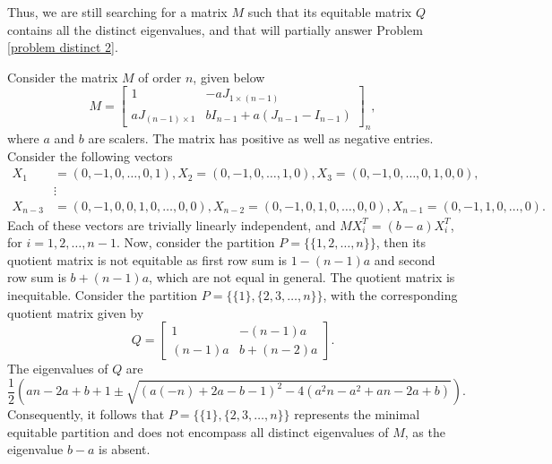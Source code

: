 \documentclass[12pt,twoside]{article}
\begin{document}
Thus, we are still searching  for a matrix $M$ such that its equitable matrix $Q$ contains all the distinct eigenvalues, and that will partially answer Problem \eqref{problem distinct 2}.

Consider the matrix $M$ of order $n$,  given below
\begin{equation}\label{mat 1}
	 M=\begin{bmatrix}
	1 & -aJ_{1\times (n-1)}\\
	a J_{(n-1)\times 1} & bI_{n-1}+a(J_{n-1}-I_{n-1})
\end{bmatrix}_{n},
\end{equation}
where $a$ and $b$ are scalers. The matrix has positive as well as negative entries. Consider the following vectors
\begin{align*}
	X_{1}&=(0,-1,0,\dots,0,1),X_{2}=(0,-1,0,\dots,1,0), X_{3}=(0,-1,0,\dots,0,1,0,0),\\
	&\vdots\\
	X_{n-3}&=(0,-1,0,0,1,0,\dots,0, 0), X_{n-2}=(0,-1,0,1,0,\dots,0,0),X_{n-1}=(0,-1,1,0,\dots,0).
\end{align*} 
Each of these vectors are trivially linearly independent, and $MX_{i}^{T}=(b-a)X_{i}^{T}$, for $i=1,2,\dots,n-1$. Now, consider the partition $P=\{\{1,2,\dots,n\}\}$, then its quotient matrix is not equitable as first row sum is  $1-(n-1)a$ and second row sum is $b+(n-1)a$, which are not equal in general. The quotient matrix is inequitable. Consider the partition \( P=\{\{1\},\{2,3,\dots,n\}\} \), with the corresponding quotient matrix given by $$Q=\begin{bmatrix} 1 & -(n-1)a\\ (n-1)a & b+(n-2)a \end{bmatrix}.$$
The eigenvalues of \( Q \) are $$ \frac{1}{2} \left(a n - 2 a + b + 1 \pm \sqrt{(a (-n) + 2 a - b - 1)^2 - 4 \left(a^2 n - a^2 + a n - 2 a + b\right)}\right). $$Consequently, it follows that $P=\{\{1\},\{2,3,\dots,n\}\}$ represents the minimal equitable partition and does not encompass all distinct eigenvalues of $M$, as the eigenvalue $b-a$ is absent. 
\end{document}
